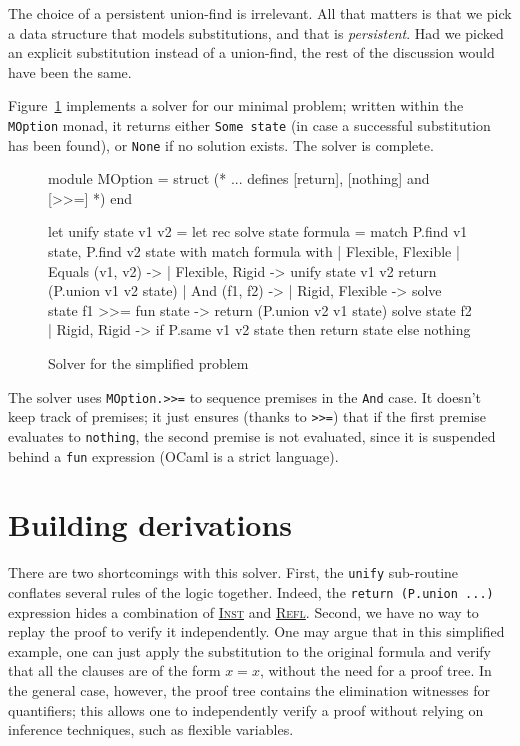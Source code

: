 \documentclass{easychair}
\def\li{\lstinline}
\let\TirName\textsc
\renewcommand{\DefTirName}[1]{\hyperlink{#1}{\TirName {#1}}}
\let\Rule\DefTirName
\newcommand{\fref}[1]{Figure~\ref{fig:#1}}
\begin{document}
The choice of a persistent union-find is irrelevant. All that matters is that we
pick a data structure that models substitutions, and that is \emph{persistent}.
Had we picked an explicit substitution instead of a union-find, the rest of the
discussion would have been the same.

\fref{solver} implements a solver for our minimal problem; written within the
\li+MOption+ monad, it returns either \li+Some state+ (in case a successful
substitution has been found), or \li+None+ if no solution exists. The solver is
complete.

\begin{figure}
  \centering
  \begin{ocaml}
module MOption = struct
  (* ... defines [return], [nothing] and [>>=] *)
end

let unify state v1 v2 =                         let rec solve state formula =
  match P.find v1 state, P.find v2 state with     match formula with
  | Flexible, Flexible                            | Equals (v1, v2) ->
  | Flexible, Rigid ->                                unify state v1 v2
      return (P.union v1 v2 state)                | And (f1, f2) ->
  | Rigid, Flexible ->                                solve state f1 >>= fun state ->
      return (P.union v2 v1 state)                    solve state f2
  | Rigid, Rigid ->
      if P.same v1 v2 state then
        return state
      else
        nothing
  \end{ocaml}
  \caption{Solver for the simplified problem}
  \label{fig:solver}
\end{figure}

The solver uses \li+MOption.>>=+ to sequence premises in the \li+And+ case. It
doesn't keep track of premises; it just ensures (thanks to \li+>>=+) that if the
first premise evaluates to \li+nothing+, the second premise is not evaluated,
since it is suspended behind a \li+fun+ expression (OCaml is a strict language).

\section{Building derivations}

There are two shortcomings with this solver. First, the \li+unify+ sub-routine
conflates several rules of the logic together. Indeed, the \li+return (P.union ...)+
expression hides a combination of \Rule{Inst} and \Rule{Refl}. Second, we
have no way to replay the proof to verify it independently. One may argue that
in this simplified example, one can just apply the substitution to the original
formula and verify that all the clauses are of the form $x = x$, without the
need for a proof tree. In the general case, however, the proof tree contains the
elimination witnesses for quantifiers; this allows one to independently verify a
proof without relying on inference techniques, such as flexible variables.
\end{document}
